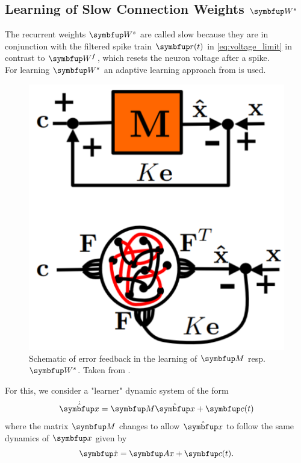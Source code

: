 \subsection{Learning of Slow Connection Weights $\bmu{W}^s$}
The recurrent weights $\bmu{W}^s$ are called slow because they are in conjunction with the filtered spike train $\bmu{r}(t)$ in \cref{eq:voltage_limit} in contrast to $\bmu{W}^f$, which resets the neuron voltage after a spike.\\
For learning $\bmu{W}^s$ an adaptive learning approach from \cite{bourdoukan_enforcing_2015} is used.\\
\begin{figure}[H]
	\centering
	\includegraphics[scale = 0.15]{screenshots/error_feedback_Ws.png}
	\caption{Schematic of error feedback in the learning of $\bmu{M}$ resp. $\bmu{W}^s$. Taken from \cite{bourdoukan_enforcing_2015}.}
	\label{fig:error_feedback_Ws}
\end{figure}
For this, we consider a "learner" dynamic system of the form
\begin{equation}
	\dot{\hat{\bmu{x}}} = \bmu{M}\hat{\bmu{x}} + \bmu{c}(t)
\end{equation}
where the matrix $\bmu{M}$ changes to allow $\hat{\bmu{x}}$ to follow the same dynamics of $\bmu{x}$ given by
\begin{equation}\label{eq:teacher}
	\bmu{\dot{x}} = \bmu{Ax} + \bmu{c}(t).
\end{equation}
